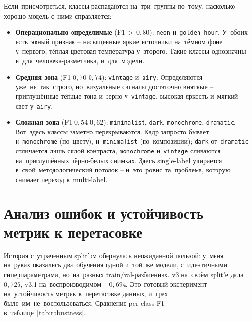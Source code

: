 \documentclass[a4paper,12pt]{diplom}
\begin{document}
Если~присмотреться, классы распадаются на~три~группы по~тому, насколько хорошо модель с~ними справляется:
\begin{itemize}
\item \textbf{Операционально определимые} (F1$\,>\,0{,}80$): \texttt{neon} и~\texttt{golden\_hour}. У~обоих есть~явный признак -- насыщенные яркие источники на~тёмном фоне у~первого, тёплая цветовая температура у~второго. Такие классы однозначны и~для~человека-разметчика, и~для~модели.
\item \textbf{Средняя зона} (F1 $0{,}70$-$0{,}74$): \texttt{vintage} и~\texttt{airy}. Определяются уже~не~так~строго, но~визуальные сигналы достаточно внятные -- приглушённые тёплые тона и~зерно у~\texttt{vintage}, высокая яркость и~мягкий свет у~\texttt{airy}.
\item \textbf{Сложная зона} (F1 $0{,}54$-$0{,}62$): \texttt{minimalist}, \texttt{dark}, \texttt{monochrome}, \texttt{dramatic}. Вот~здесь классы заметно перекрываются. Кадр запросто бывает и~\texttt{monochrome} (по~цвету), и~\texttt{minimalist} (по~композиции); \texttt{dark} от~\texttt{dramatic} отличается лишь силой контраста; \texttt{monochrome} и~\texttt{vintage} сливаются на~приглушённых чёрно-белых снимках. Здесь single-label упирается в~свой~методологический потолок -- и~это~ровно та~проблема, которую снимает переход к~multi-label.
\end{itemize}

\section{Анализ ошибок и устойчивость метрик к перетасовке}
\label{sec:robustness}

История с~утраченным split'ом обернулась неожиданной пользой: у~меня на~руках оказались два~обучения одной и~той~же модели, с~идентичными гиперпараметрами, но~на~разных train/val-разбиениях. v3 на~своём split'е дала $0{,}726$, v3.1 на~воспроизводимом -- $0{,}694$. Это~готовый эксперимент на~устойчивость метрик к~перетасовке данных, и~грех было~им~не~воспользоваться. Сравнение per-class F1 -- в~таблице~\ref{tab:robustness}.
\end{document}
